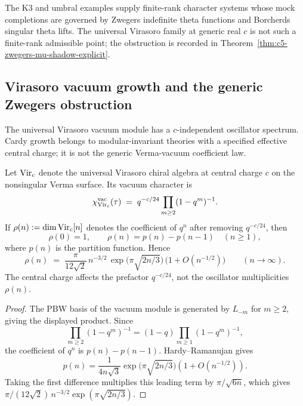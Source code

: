 \begin{evidence}
The K3 and umbral examples supply finite-rank character systems whose
mock completions are governed by Zwegers indefinite theta functions
and Borcherds singular theta lifts. The universal Virasoro family at
generic real $c$ is not such a finite-rank admissible point; the
obstruction is recorded in
Theorem~\ref{thm:c5-zwegers-mu-shadow-explicit}.
\end{evidence}

\subsection{Virasoro vacuum growth and the generic Zwegers obstruction}
\label{subsec:c5-zwegers-mu-shadow-explicit}
%
%
%
%

The universal Virasoro vacuum module has a $c$-independent oscillator
spectrum. Cardy growth belongs to modular-invariant theories with a
specified effective central charge; it is not the generic
Verma-vacuum coefficient law.

\begin{proposition}
\label{prop:c5-hardy-ramanujan-cardy}
%
Let $\mathrm{Vir}_c$ denote the universal Virasoro chiral algebra at
central charge $c$ on the nonsingular Verma surface. Its vacuum
character is
\[
\chi_{\mathrm{Vir}_c}^{\rm vac}(\tau)
\;=\;
q^{-c/24}\prod_{m\ge2}(1-q^m)^{-1}.
\]
If $\rho(n):=\dim \mathrm{Vir}_c[n]$ denotes the coefficient of $q^n$ after
removing $q^{-c/24}$, then
\[
\rho(0)=1,\qquad \rho(n)=p(n)-p(n-1)\quad(n\ge1),
\]
where $p(n)$ is the partition function. Hence
\begin{equation}
\label{eq:c5-hardy-ramanujan-cardy}
\rho(n)
\;=\;
\frac{\pi}{12\sqrt2}\,
n^{-3/2}\,
\exp\!\bigl(\pi\sqrt{2n/3}\bigr)\,
\bigl(1 + O(n^{-1/2})\bigr)
\qquad (n \to \infty).
\end{equation}
The central charge affects the prefactor $q^{-c/24}$, not the
oscillator multiplicities $\rho(n)$.
\end{proposition}

\begin{proof}
The PBW basis of the vacuum module is generated by
$L_{-m}$ for $m\ge2$, giving the displayed product. Since
\[
\prod_{m\ge2}(1-q^m)^{-1}
=(1-q)\prod_{m\ge1}(1-q^m)^{-1},
\]
the coefficient of $q^n$ is $p(n)-p(n-1)$. Hardy--Ramanujan gives
\[
p(n)=\frac{1}{4n\sqrt3}
\exp\!\bigl(\pi\sqrt{2n/3}\bigr)(1+O(n^{-1/2})).
\]
Taking the first difference multiplies this leading term by
\(\pi/\sqrt{6n}\), which gives
\(\pi/(12\sqrt2)\,n^{-3/2}\exp(\pi\sqrt{2n/3})\).
\end{proof}

